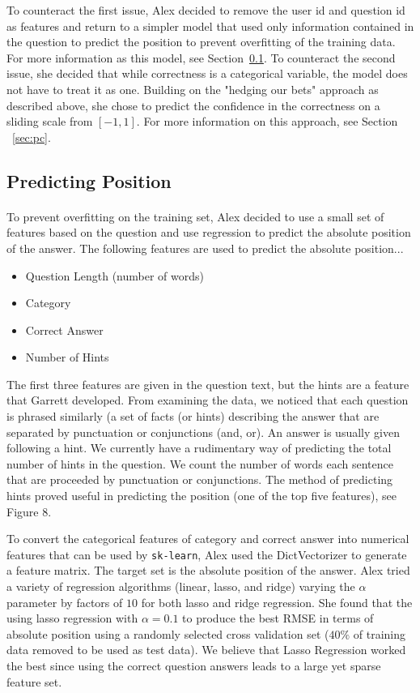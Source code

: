 \documentclass[letterpaper]{article}
\begin{document}
To counteract the first issue, Alex decided to remove the user id and question id as features and return to a simpler model that used only information contained in the question to predict the position to prevent overfitting of the training data.  For more information as this model, see Section~\ref{sec:pp}.  To counteract the second issue, she decided that while correctness is a categorical variable, the model does not have to treat it as one.  Building on the "hedging our bets" approach as described above, she chose to predict the confidence in the correctness on a sliding scale from $[-1,1]$.  For more information on this approach, see Section ~\ref{sec:pc}.

\subsection{Predicting Position}
\label{sec:pp}
\paragraph{}To prevent overfitting on the training set, Alex decided to use a small set of features based on the question and use regression to predict the absolute position of the answer.  The following features are used to predict the absolute position...
\begin{itemize}
\item Question Length (number of words)
\item Category
\item Correct Answer
\item Number of Hints
\end{itemize}
The first three features are given in the question text, but the hints are a feature that Garrett developed.  From examining the data, we noticed that each question is phrased similarly (a set of facts (or hints) describing the answer that are separated by punctuation or conjunctions (and, or).  An answer is usually given following a hint.  We currently have a rudimentary way of predicting the total number of hints in the question.  We count the number of words each sentence that are proceeded by punctuation or conjunctions.  The method of predicting hints proved useful in predicting the position (one of the top five features), see Figure 8.  

\lstset{
  basicstyle=\itshape
  }

To convert the categorical features of category and correct answer into numerical features that can be used by \lstinline{sk-learn}, Alex used the DictVectorizer to generate a feature matrix.  The target set is the absolute position of the answer.  Alex tried a variety of regression algorithms (linear, lasso, and ridge) varying the $\alpha$ parameter by factors of $10$ for both lasso and ridge regression.  She found that the using lasso regression with $\alpha=0.1$ to produce the best RMSE in terms of absolute position using a randomly selected cross validation set ($40\%$ of training data removed to be used as test data).  We believe that Lasso Regression worked the best since using the correct question answers leads to a large yet sparse feature set.
\end{document}

